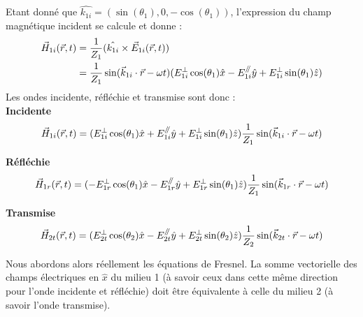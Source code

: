 Etant donné que $\hat{k_{1i}} = (\sin(\theta_{1}),0,-\cos(\theta_{1})) $, l'expression du champ magnétique incident se calcule et donne :
\begin{equation*}
\begin{split}
\vec{H}_{1i}(\vec{r},t)& = \frac{1}{Z_1} (\hat{k_{1i}} \times \vec{E}_{1i}(\vec{r},t))\\ &= \frac{1}{Z_1} \sin(\vec{k}_{1i}\cdot \vec{r} - \omega t)(E^{\perp}_{1i}\cos(\theta_{1}) \hat{x} - E^{\mathbin{/\mkern-5mu/}}_{1i} \hat{y} + E^{\perp}_{1i}\sin(\theta_{1}) \hat{z} )
\end{split}
\end{equation*}
Les ondes incidente, réfléchie et transmise sont donc :\\ 
\textbf{Incidente} $$ \vec{H}_{1i} (\vec{r},t) = (E^{\perp}_{1i}\cos(\theta_{1}) \hat{x} + E^{\mathbin{/\mkern-5mu/}}_{1i} \hat{y} + E^{\perp}_{1i}\sin(\theta_{1}) \hat{z} ) \frac{1}{Z_1} \sin(\vec{k}_{1i}\cdot \vec{r} - \omega t)$$

\textbf{Réfléchie} $$ \vec{H}_{1r} (\vec{r},t) = (-E^{\perp}_{1r} \cos(\theta_{1})  \hat{x} - E_{1r}^{\mathbin{/\mkern-5mu/}} \hat{y} + E_{1r}^{\perp} \sin(\theta_{1}) \hat{z} ) \frac{1}{Z_1} \sin(\vec{k}_{1r}\cdot \vec{r} - \omega t) $$

\textbf{Transmise} $$ \vec{H}_{2t} (\vec{r},t) = (E^{\perp}_{2t} \cos(\theta_{2})  \hat{x} - E_{2t}^{\mathbin{/\mkern-5mu/}} \hat{y} + E_{2t}^{\perp} \sin(\theta_{2}) \hat{z} ) \frac{1}{Z_2}\sin(\vec{k}_{2t}\cdot \vec{r} - \omega t) $$
 
Nous abordons alors réellement les équations de Fresnel.
 La somme vectorielle des champs électriques en $\hat{x}$ 
du milieu 1 (à savoir ceux dans cette même direction pour l'onde incidente et réfléchie) doit être équivalente à celle du milieu 2 (à savoir l'onde transmise).%


